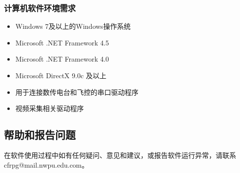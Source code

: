 \subsubsection{计算机软件环境需求}
\begin{itemize}[topsep=0pt]
\setlength{\itemsep}{-2pt}
\item Windows 7及以上的Windows操作系统
\item Microsoft .NET Framework 4.5
\item Microsoft .NET Framework 4.0
\item Microsoft DirectX 9.0c 及以上
\item 用于连接数传电台和飞控的串口驱动程序
\item 视频采集相关驱动程序
\end{itemize}

\subsection{帮助和报告问题}
在软件使用过程中如有任何疑问、意见和建议，或报告软件运行异常，请联系 cfrpg@mail.nwpu.edu.com。

\clearpage
\endinput








